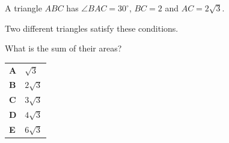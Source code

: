 \documentclass[11pt,a4paper]{article}
\begin{document}
\thispagestyle{djspaper}
\djsFrontMatter
\thispagestyle{djspaper}
\vspace*{8pt}
\begin{enumerate}[label=\textbf{\arabic*.},leftmargin=*,itemsep=0pt,start=1]
\questionitem[Trigonometry]
A triangle $ABC$ has $\angle BAC=30^\circ$, $BC=2$ and $AC=2\sqrt{3}$. 

Two different triangles satisfy these conditions. 

What is the sum of their areas?

\par\vspace*{12pt}
\begin{tabularx}{\linewidth}{@{}>{\bfseries}l Y@{}}
A &
$\sqrt{3}$
\\[0.8em]
B &
$2\sqrt{3}$
\\[0.8em]
C &
$3\sqrt{3}$
\\[0.8em]
D &
$4\sqrt{3}$
\\[0.8em]
E &
$6\sqrt{3}$
\\
\end{tabularx}
\end{enumerate}
\clearpage
\thispagestyle{djspaper}
\vspace*{8pt}
\end{document}
